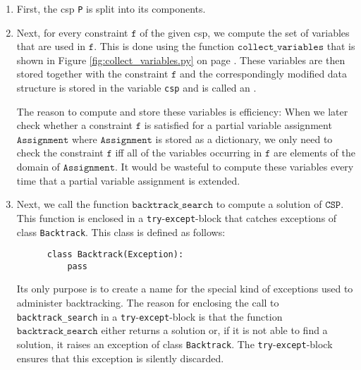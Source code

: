 \begin{enumerate}
\item First, the \ac{csp} \texttt{P} is split into its components.
\item Next, for every constraint $\texttt{f}$ of the given \ac{csp}, we compute the set of variables that
      are used in $\texttt{f}$.  This is done using the function $\texttt{collect\_variables}$ that is shown in
      Figure \ref{fig:collect_variables.py} on page \pageref{fig:collect_variables.py}.
      These variables are then stored together with the constraint $\texttt{f}$ and
      the correspondingly modified data structure is stored in the variable \texttt{csp} and is called an
      .

      The reason to compute and store these variables is efficiency: When we later check whether a constraint $\texttt{f}$
      is satisfied for a partial variable assignment $\texttt{Assignment}$ where $\texttt{Assignment}$ is
      stored as a dictionary, we only need to check the constraint $\texttt{f}$ iff all of the variables occurring
      in $\texttt{f}$ are elements of the domain of $\texttt{Assignment}$.   It would be wasteful to compute
      these variables every time that a partial variable assignment is extended.
\item Next, we call the function $\texttt{backtrack\_search}$ to compute a solution of $\texttt{CSP}$.
      This function is enclosed in a \texttt{try}-\texttt{except}-block that catches exceptions of class
      \texttt{Backtrack}.  This class is defined as follows:
      
\begin{verbatim}
      class Backtrack(Exception):
          pass
\end{verbatim}
      Its only purpose is to create a name for the special kind of exceptions used to administer backtracking.
      The reason for enclosing the call to \texttt{backtrack\_search} in a \texttt{try}-\texttt{except}-block
      is that the function $\texttt{backtrack\_search}$ either returns a solution or, if it is not
      able to find a solution, it raises an exception of class \texttt{Backtrack}.
      The \texttt{try}-\texttt{except}-block ensures that this exception is silently discarded.
\end{enumerate}

